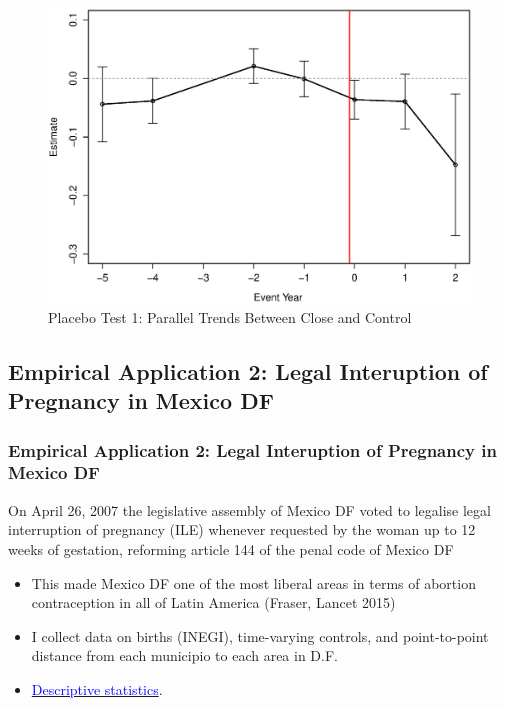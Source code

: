 \documentclass[10pt,letterpaper,subeqn]{beamer}
\begin{document}
\begin{frame}[label=empirA5]
\begin{figure}
\begin{center}
\caption{Placebo Test 1: Parallel Trends Between Close and Control}
\includegraphics[scale=0.45]{./figures/Event1519close.eps}
\end{center}
\end{figure}
\end{frame}




\subsection{Empirical Application 2: Legal Interuption of Pregnancy in Mexico DF}
\begin{frame}[label=empirB]
  \frametitle{Empirical Application 2: Legal Interuption of Pregnancy in Mexico DF}
On April 26, 2007 the legislative assembly of Mexico DF voted to legalise legal 
interruption of pregnancy (ILE) whenever requested by the woman up to 12 weeks of 
gestation, reforming article 144 of the penal code of Mexico DF
\vspace{9mm}
\begin{itemize}
\item This made Mexico DF one of the most liberal areas in terms of abortion
contraception in all of Latin America (Fraser, Lancet 2015)
\item I collect data on births (INEGI), time-varying controls, and point-to-point
distance from each municipio to each area in D.F.
\item \hyperlink{MexicoDesc}{\textcolor{blue}{Descriptive statistics}}.
\end{itemize}

\end{frame}
\end{document}
